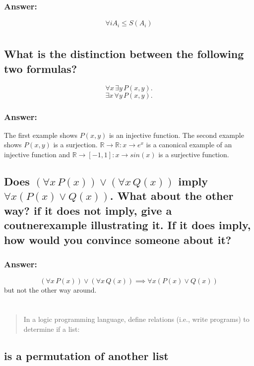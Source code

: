 \documentclass[titlepage]{article}\usepackage[]{graphicx}\usepackage[]{color}
\begin{document}
  \subsubsection{Answer:}
  \[ \forall i A_i \leq S(A_i) \]

  \section{}
  \subsection{What is the distinction between the following two formulas?}
  \[ \forall x \, \exists y \, P(x,y). \]
  \[ \exists x \, \forall y \, P(x,y). \]
  \subsubsection{Answer:}
  The first example shows $P(x,y)$ is an injective function. The second example
  shows $P(x,y)$ is a surjection. $\mathbb{R} \to \mathbb{R} : x \to e^x$ is a
  canonical example of an injective function and $\mathbb{R} \to [-1,1]: x \to
  sin(x)$ is a surjective function.  


  \subsection{Does $(\forall x \, P(x)) \lor (\forall x \, Q(x))$ imply $\forall
    x (P(x) \lor Q(x))$. What about the other way? if it does not imply, give a
    coutnerexample illustrating it. If it does imply, how would you convince
    someone about it?}
    \subsubsection{Answer:}
    \[ (\forall x \, P(x)) \lor (\forall x \, Q(x)) \implies \forall x (P(x)
      \lor Q(x)) \] 
      but not the other way around. 

\section{ }
  \begin{quote}
    {In a logic programming language, define relations (i.e., write programs)
    to determine if a list:}
  \end{quote}

  \subsection{is a permutation of another list}
\end{document}
